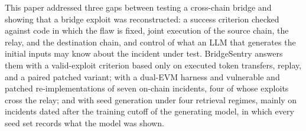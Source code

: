 \documentclass[a4paper]{cas-sc}
\begin{document}
This paper addressed three gaps between testing a cross-chain bridge and showing that a bridge exploit was reconstructed: a success criterion checked against code in which the flaw is fixed, joint execution of the source chain, the relay, and the destination chain, and control of what an LLM that generates the initial inputs may know about the incident under test. BridgeSentry answers them with a valid-exploit criterion based only on executed token transfers, replay, and a paired patched variant; with a dual-EVM harness and vulnerable and patched re-implementations of seven on-chain incidents, four of whose exploits cross the relay; and with seed generation under four retrieval regimes, mainly on incidents dated after the training cutoff of the generating model, in which every seed set records what the model was shown.
\end{document}
